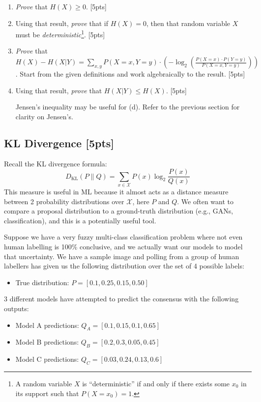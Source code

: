 \begin{enumerate}[label=\alph*.]
    \item \emph{Prove} that $H(X) \geq 0$. [5pts]

    \item Using that result, \emph{prove} that if $H(X) = 0$, then that random variable $X$ must be \textit{deterministic}\footnote{A random variable $X$ is ``deterministic'' if and only if there exists some $x_0$ in its support such that $P(X = x_0) = 1$.}. [5pts]

    \item \emph{Prove} that $H(X) - H(X|Y) = \sum_{x,y} P(X=x, Y=y) \cdot \left(-\log_2\left(\frac{P(X=x)\cdot P(Y=y)}{P(X=x, Y=y)}\right)\right)$. Start from the given definitions and work algebraically to the result. [5pts]

    \item Using that result, \emph{prove} that $H(X|Y) \leq H(X)$. [5pts]
    \begin{hintbox}
        Jensen's inequality may be useful for (d). Refer to the previous section for clarity on Jensen's.
    \end{hintbox}
\end{enumerate}



\newpage
\subsection{KL Divergence [5pts]}
Recall the KL divergence formula:
$$D_{\text{KL}}(P \| Q) = \sum_{x \in \mathcal{X}} P(x) \log_2 \frac{P(x)}{Q(x)}$$
This measure is useful in ML because it almost acts as a distance measure between 2 probability distributions over $\mathcal{X}$, here $P$ and $Q$. We often want to compare a proposal distribution to a ground-truth distribution (e.g., GANs, classification), and this is a potentially useful tool.

\smallskip Suppose we have a very fuzzy multi-class classification problem where not even human labelling is 100\% conclusive, and we actually want our models to model that uncertainty. We have a sample image and polling from a group of human labellers has given us the following distribution over the set of 4 possible labels:
\begin{itemize}
    \item True distribution: $P = [0.1, 0.25, 0.15, 0.50]$
\end{itemize}

3 different models have attempted to predict the consensus with the following outputs:
\begin{itemize}
    \itemsep0em
    \item Model A predictions: $Q_A = [0.1, 0.15, 0.1, 0.65]$
    \item Model B predictions: $Q_B = [0.2, 0.3, 0.05, 0.45]$
    \item Model C predictions: $Q_C = [0.03, 0.24, 0.13, 0.6]$
\end{itemize}

